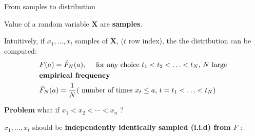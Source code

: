\documentclass{beamer}
\begin{document}




\begin{frame}{From samples to distribution}
   
     Value of a random variable $\mathbf{X}$ are \textbf{samples}. 


     \medskip

     Intuitively, if $x_1,\ldots, x_t$ samples of $\mathbf{X}$, ($t$ row index),
     the the distribution can be computed:
      \[ 
        \begin{split}
		& F(a)=\hat{F}_N(a),\quad  \mbox{ for any choice $t_1 < t_2 < \ldots < t_N$, $N$ large} \\
        & \mbox{\textbf{empirical frequency}} \\
        & \hat{F}_N(a)=\frac{1}{N} (\mbox{ number of times $x_t \le a$, $t=t_1 < \ldots < t_N$})  
        \end{split}
	  \]

    \textbf{Problem} what if $x_1 < x_2 < \cdots < x_n$ ? 

    \bigskip 

    $x_1,\ldots, x_t$ should be \textbf{independently identically sampled (i.i.d) from $F$} :
 \end{frame}
\end{document}
